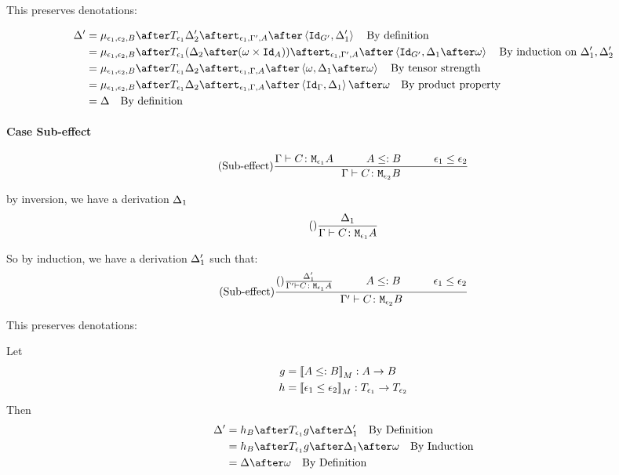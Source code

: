 {    This preserves denotations:

    \begin{align}
        \D' & = \bind{\e_1}{\e_2}{B}\after\T{\e_1}{\D_2'}\after\tstrength{\e_1}{\G'}{A}\after\pr{\Id{G'}}{\D_1'}\qt{By definition}\\
        & = \bind{\e_1}{\e_2}{B}\after\T{\e_1}{(\D_2\after(\w\times\Id{A}))}\after\tstrength{\e_1}{\G'}{A}\after\pr{\Id{G'}}{\D_1\after\w}\qt{By induction on $\D_1', \D_2'$}\\
        & = \bind{\e_1}{\e_2}{B}\after\T{\e_1}{\D_2}\after\tstrength{\e_1}{\G}{A}\after\pr{\w}{\D_1\after\w}\qt{By tensor strength}\\
        & = \bind{\e_1}{\e_2}{B}\after\T{\e_1}{\D_2}\after\tstrength{\e_1}{\G}{A}\after\pr{\idg}{\D_1}\after\w\qt{By product property}\\
        & = \D \qt{By definition}
    \end{align}





    \paragraph{Case Sub-effect}


    \begin{equation}
        \treerule{Sub-effect}{\gtyperelation{C}{\M{\e_1}{A}}\s\s A\subtype B\s\s \e_1\subeffect\e_2}{\gtyperelation{C}{\M{\e_2}{B}}}
    \end{equation}

    by inversion, we have a derivation $\Delta_1$
    \begin{equation}
        (\text{}) \frac{\Delta_1}{\Gamma \vdash C \colon \texttt{M}_{\epsilon_1}{A}}
    \end{equation}

    So by induction, we have a derivation $\Delta_1'$ such that:
    \begin{equation}
        \treerule{Sub-effect}{\treerule{}{\D_1'}{\typerelation{\G'}{C}{\M{\e_1}{A}}}\s\s A \subtype B\s\s \e_1\subeffect\e_2}{\typerelation{\G'}{C}{\M{\e_2}{B}}}
    \end{equation}

    This preserves denotations:

    Let
    \begin{align}
        g &= {\bf [\![}A \leq: B{\bf ]\!]}_M: A \rightarrow B\\
        h &= {\bf [\![}\epsilon_1\leq\epsilon_2{\bf ]\!]}_M: T_{\epsilon_1}{}\rightarrow T_{\epsilon_2}{}
    \end{align}
    Then
    \begin{align}
        \D' & = h_B\after\T{\e_1}{g}\after \D_1' \qt{By Definition}\\
        & = h_B\after\T{\e_1}{g}\after \D_1\after\w\qt{By Induction}\\
        & = \D\after\w\qt{By Definition}
    \end{align}

}

\ifdefined\NoDocument
\else
\documentclass{report}


   \Weakening

\fi